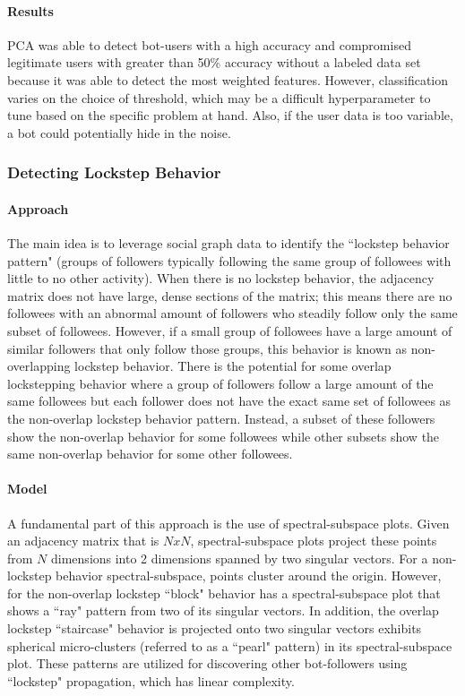 \documentclass[11pt, oneside]{article}   	%
\begin{document}
\paragraph{Results}
\quad

\quad PCA was able to detect bot-users with a high accuracy and compromised legitimate users with greater than 50\% accuracy without a labeled data set because it was able to detect the most weighted features.
However, classification varies on the choice of threshold, which may be a difficult hyperparameter to tune based on the specific problem at hand.
Also, if the user data is too variable, a bot could potentially hide in the noise.

\subsubsection{Detecting Lockstep Behavior}

\paragraph{Approach}
\quad

\quad The main idea \cite{lockstep} is to leverage social graph data to identify the ``lockstep behavior pattern" (groups of followers typically following the same group of followees with little to no other activity).
When there is no lockstep behavior, the adjacency matrix does not have large, dense sections of the matrix; this means there are no followees with an abnormal amount of followers who steadily follow only the same subset of followees.
However, if a small group of followees have a large amount of similar followers that only follow those groups, this behavior is known as non-overlapping lockstep behavior.
There is the potential for some overlap lockstepping behavior where a group of followers follow a large amount of the same followees but each follower does not have the exact same set of followees as the non-overlap lockstep behavior pattern.
Instead, a subset of these followers show the non-overlap behavior for some followees while other subsets show the same non-overlap behavior for some other followees.

\paragraph{Model}
\quad

\quad A fundamental part of this approach is the use of spectral-subspace plots.
Given an adjacency matrix that is $NxN$, spectral-subspace plots project these points from $N$ dimensions into 2 dimensions spanned by two singular vectors.
For a non-lockstep behavior spectral-subspace, points cluster around the origin.
However, for the non-overlap lockstep ``block" behavior has a spectral-subspace plot that shows a ``ray" pattern from two of its singular vectors.
In addition, the overlap lockstep ``staircase" behavior is projected onto two singular vectors exhibits spherical micro-clusters (referred to as a ``pearl" pattern) in its spectral-subspace plot.
These patterns are utilized for discovering other bot-followers using ``lockstep" propagation, which has linear complexity.
\end{document}
